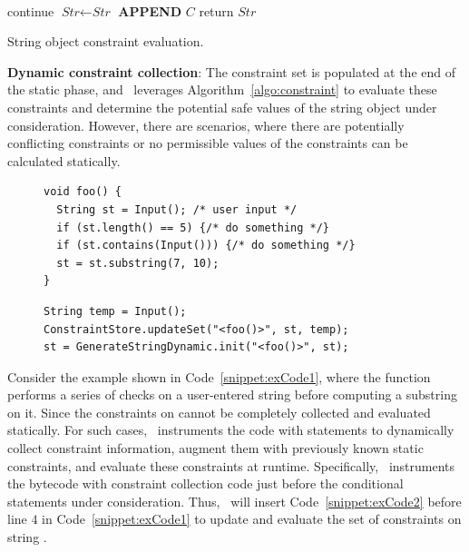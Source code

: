 \begin{mylist}
\begin{algorithm}[t]
{     {
         {\\
          \mytab  continue
        }
        $\textit{Str} \leftarrow \textit{Str}$ {\bf APPEND} $C$
    }
    return $\textit{Str}$
}
\caption{String object constraint evaluation.}
\label{algo:constraint}
\end{algorithm}

 \item \textbf{Dynamic constraint collection}: The constraint set is populated
at the end of the static phase, and \tool\ leverages
Algorithm~\ref{algo:constraint} to evaluate these constraints and determine the
potential safe values of the string object under consideration. However, there
are scenarios, where there are potentially conflicting constraints or no
permissible values of the constraints can be calculated statically.

\lstset{language=Java, caption=Code requiring dynamic string constraint
evaluation., label =
snippet:exCode1, firstnumber =1}
\begin{figure}[t]
\begin{lstlisting}
void foo() {
  String st = Input(); /* user input */
  if (st.length() == 5) {/* do something */}
  if (st.contains(Input())) {/* do something */}
  st = st.substring(7, 10);
}
\end{lstlisting}
\end{figure}

\begin{figure}[t]
\begin{lstlisting}
String temp = Input();
ConstraintStore.updateSet("<foo()>", st, temp);
st = GenerateStringDynamic.init("<foo()>", st);
\end{lstlisting}
\end{figure}

Consider the example shown in Code~\ref{snippet:exCode1}, where the function
 performs a series of checks on a user-entered string  before computing
a substring on it. Since the constraints on  cannot be
completely collected and evaluated statically. For such cases, \tool\
instruments the code with statements to dynamically collect constraint
information, augment them with previously known static constraints, and evaluate
these constraints at runtime. Specifically, \tool\ instruments the bytecode
with constraint collection code just before the conditional statements under
consideration. Thus, \tool\ will insert Code~\ref{snippet:exCode2} before line
$4$ in Code~\ref{snippet:exCode1} to update and evaluate the set of constraints
on string \code{st}.

\end{mylist}

